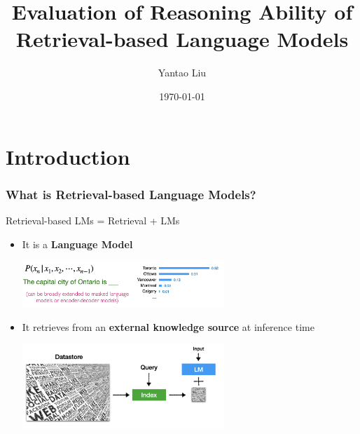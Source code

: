\documentclass{beamer}
\title{Evaluation of Reasoning Ability of Retrieval-based Language Models}
\author{Yantao Liu}
\date{\today}
\begin{document}
\maketitle

\section{Introduction}
\begin{frame}
\frametitle{What is Retrieval-based Language Models?}
    Retrieval-based LMs = Retrieval + LMs
    \begin{itemize}
        \item It is a \textbf{Language Model} \\
        \begin{center}
            \includegraphics[width=0.6\textwidth]{figure/lm.png}
        \end{center}
        \item It retrieves from an \textbf{external knowledge source} at inference time
        \begin{center}
            \includegraphics[width=0.6\textwidth]{figure/retrieval.png}
        \end{center}
    \end{itemize}
\end{frame}
\end{document}
